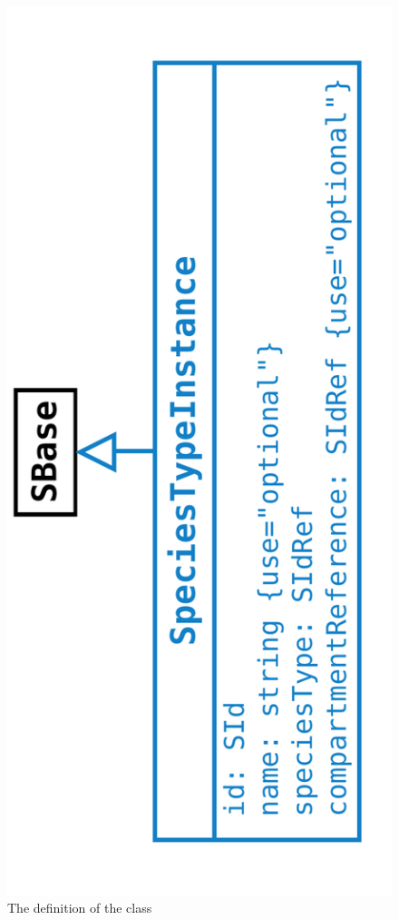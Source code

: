 \begin{figure}[htb]
  \begin{center}
    \includegraphics[angle=-90, scale=0.31]{./figs/multi_004_speciesTypeInstance.pdf}
    \caption{The definition of the \SpeciesTypeInstance class}
  \label{fig:SpeciesTypeInstance}
  \end{center}
\end{figure}

